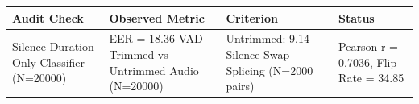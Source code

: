 \begin{tabular}{llll}
\toprule
Audit Check & Observed Metric & Criterion & Status \\
\midrule
Silence-Duration-Only Classifier (N=20000) & EER = 18.36%
VAD-Trimmed vs Untrimmed Audio (N=20000) & Untrimmed: 9.14%
Silence Swap Splicing (N=2000 pairs) & Pearson r = 0.7036, Flip Rate = 34.85%
\bottomrule
\end{tabular}
